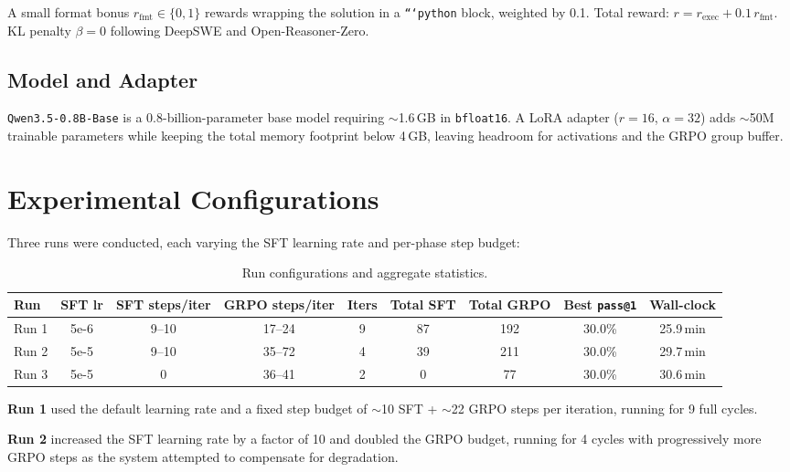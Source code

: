 \documentclass[11pt,a4paper]{article}
\makeatletter
\newcommand{\passkone}{\texttt{pass@1}}
\newcommand{\model}{\texttt{Qwen3.5-0.8B-Base}}
\makeatother
\begin{document}
A small format bonus $r_{\text{fmt}} \in \{0, 1\}$ rewards wrapping the
solution in a \texttt{```python} block, weighted by 0.1.
Total reward: $r = r_{\text{exec}} + 0.1\,r_{\text{fmt}}$.
KL penalty $\beta{=}0$ following DeepSWE and Open-Reasoner-Zero.

\subsection{Model and Adapter}

\model{} is a 0.8-billion-parameter base model requiring $\sim$1.6\,GB in
\texttt{bfloat16}. A LoRA adapter ($r{=}16$, $\alpha{=}32$) adds $\sim$50M
trainable parameters while keeping the total memory footprint below 4\,GB,
leaving headroom for activations and the GRPO group buffer.

\section{Experimental Configurations}

Three runs were conducted, each varying the SFT learning rate and per-phase
step budget:

\begin{table}[H]
\centering
\caption{Run configurations and aggregate statistics.}
\begin{tabular}{@{}lcccccccc@{}}
\toprule
\textbf{Run} & \textbf{SFT lr} & \textbf{SFT steps/iter}
             & \textbf{GRPO steps/iter} & \textbf{Iters}
             & \textbf{Total SFT} & \textbf{Total GRPO}
             & \textbf{Best \passkone{}} & \textbf{Wall-clock} \\
\midrule
Run 1 & 5e-6 & 9--10 & 17--24 & 9 & 87  & 192 & 30.0\% & 25.9\,min \\
Run 2 & 5e-5 & 9--10 & 35--72 & 4 & 39  & 211 & 30.0\% & 29.7\,min \\
Run 3 & 5e-5 & 0     & 36--41 & 2 & 0   & 77  & 30.0\% & 30.6\,min \\
\bottomrule
\end{tabular}
\end{table}

\textbf{Run 1} used the default learning rate and a fixed step budget of
$\sim$10 SFT + $\sim$22 GRPO steps per iteration, running for 9 full cycles.

\textbf{Run 2} increased the SFT learning rate by a factor of 10 and doubled
the GRPO budget, running for 4 cycles with progressively more GRPO steps as
the system attempted to compensate for degradation.
\end{document}
